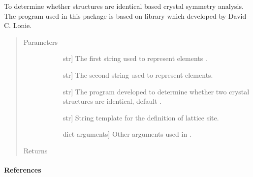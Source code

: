 \documentclass[letterpaper,10pt,english]{sphinxmanual}
\begin{document}
\begin{fulllineitems}
\label{\detokenize{pygace:pygace.utility.compare_crystal}}
To determine whether structures are identical based crystal symmetry
analysis. The program used in this package is based on  library
which developed by David C. Lonie.
\begin{quote}\begin{description}
\item[{Parameters}] \leavevmode\begin{description}
\item[{}] \leavevmode{[}str{]}
The first string used to represent elements .

\item[{}] \leavevmode{[}str{]}
The second string used to represent elements.

\item[{}] \leavevmode{[}str{]}
The program developed to determine whether two
crystal structures are identical, default .

\item[{}] \leavevmode{[}str{]}
String template for the definition of lattice site.

\item[{}] \leavevmode{[}dict arguments{]}
Other arguments used in .

\end{description}

\item[{Returns}] \leavevmode\begin{description}
\item[{}] \leavevmode
\end{description}

\end{description}\end{quote}
\paragraph{References}


\end{fulllineitems}
\end{document}
